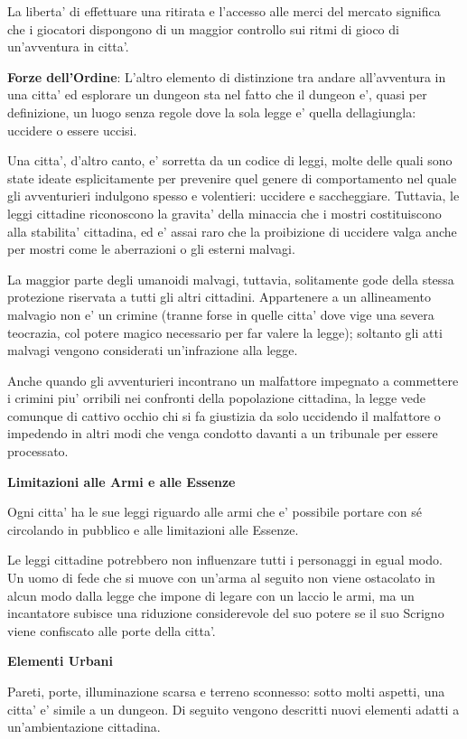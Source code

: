 \documentclass[a4paper,11pt,twoside,openany]{book}
\begin{document}
{		La liberta' di effettuare una ritirata e l'accesso alle merci del mercato significa che i giocatori dispongono di un maggior controllo sui ritmi di gioco di un'avventura in citta'.
		
		\textbf{Forze dell'Ordine}: L'altro elemento di distinzione tra andare all'avventura in una citta' ed esplorare un dungeon sta nel fatto che il dungeon e', quasi per definizione, un luogo senza regole dove la sola legge e' quella dellagiungla: uccidere o essere uccisi.
		
		Una citta', d'altro canto, e' sorretta da un codice di leggi, molte delle quali sono state ideate esplicitamente per prevenire quel genere di comportamento nel quale gli avventurieri indulgono spesso e volentieri: uccidere e saccheggiare. Tuttavia, le leggi cittadine riconoscono la gravita' della minaccia che i mostri costituiscono alla stabilita' cittadina, ed e' assai raro che la proibizione di uccidere valga anche per mostri come le aberrazioni o gli esterni malvagi.
		
		La maggior parte degli umanoidi malvagi, tuttavia, solitamente gode della stessa protezione riservata a tutti gli altri cittadini. Appartenere a un allineamento malvagio non e' un crimine (tranne forse in quelle citta' dove vige una severa teocrazia, col potere magico necessario per far valere la legge); soltanto gli atti malvagi vengono considerati un'infrazione alla legge. 
		
		Anche quando gli avventurieri incontrano un malfattore impegnato a commettere i crimini piu' orribili nei confronti della popolazione cittadina, la legge vede comunque di cattivo occhio chi si fa giustizia da solo uccidendo il malfattore o impedendo in altri modi che venga condotto davanti a un tribunale per essere processato.
		
		\textbf{Limitazioni alle Armi e alle Essenze}
		
		Ogni citta' ha le sue leggi riguardo alle armi che e' possibile portare con sé circolando in pubblico e alle limitazioni alle Essenze.
		
		Le leggi cittadine potrebbero non influenzare tutti i personaggi in egual modo. Un uomo di fede che si muove con un'arma al seguito non viene ostacolato in alcun modo dalla legge che impone di legare con un laccio le armi, ma un incantatore subisce una riduzione considerevole del suo potere se il suo Scrigno viene confiscato alle porte della citta'.
		
		\textbf{Elementi Urbani}
		
		Pareti, porte, illuminazione scarsa e terreno sconnesso: sotto molti aspetti, una citta' e' simile a un dungeon. Di seguito vengono descritti nuovi elementi adatti a un'ambientazione cittadina.
		
}
\end{document}

